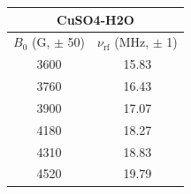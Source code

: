 \begin{tabular}{cc}
\hline
\multicolumn{2}{c}{CuSO4-H2O} \\
\hline
$B_0$ (G, $\pm$ 50) & $\nu_{\mathrm{rf}}$ (MHz, $\pm$ 1) \\
\hline
3600 & 15.83 \\
3760 & 16.43 \\
3900 & 17.07 \\
4180 & 18.27 \\
4310 & 18.83 \\
4520 & 19.79 \\
\hline
\end{tabular}
